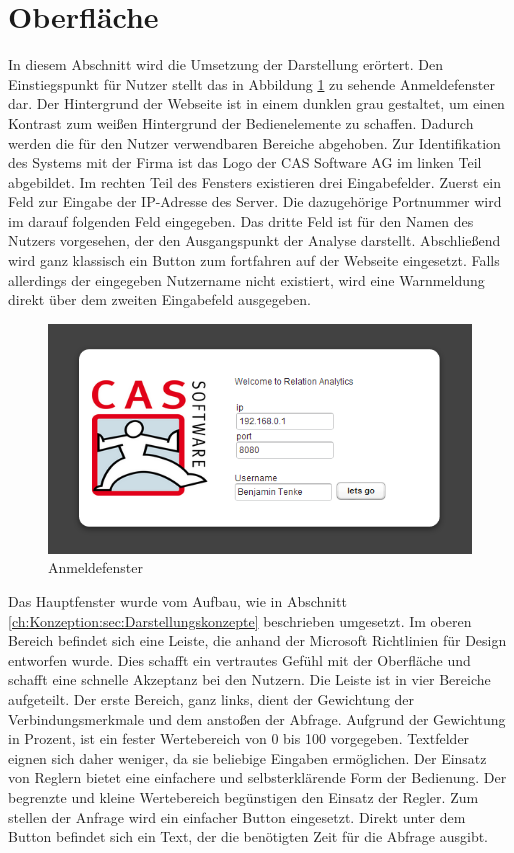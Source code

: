 \section{Oberfläche}

In diesem Abschnitt wird die Umsetzung der Darstellung erörtert. Den Einstiegspunkt für Nutzer stellt das in Abbildung \ref{ergebniss_oberflaeche_anmeld} zu sehende Anmeldefenster dar. Der Hintergrund der Webseite ist in einem dunklen grau gestaltet, um einen Kontrast zum weißen Hintergrund der Bedienelemente zu schaffen. Dadurch werden die für den Nutzer verwendbaren Bereiche abgehoben. Zur Identifikation des Systems mit der Firma ist das Logo der CAS Software AG im linken Teil abgebildet. Im rechten Teil des Fensters existieren drei Eingabefelder. Zuerst ein Feld zur Eingabe der IP-Adresse des Server. Die dazugehörige Portnummer wird im darauf folgenden Feld eingegeben. Das dritte Feld ist für den Namen des Nutzers vorgesehen, der den Ausgangspunkt der Analyse darstellt. Abschließend wird ganz klassisch ein Button zum fortfahren auf der Webseite eingesetzt. Falls allerdings der eingegeben Nutzername nicht existiert, wird eine Warnmeldung direkt über dem zweiten Eingabefeld ausgegeben. 

\begin{figure}[htbp]
\centering
\includegraphics[scale=2.0]{pics/login.png}
\caption{Anmeldefenster}
\label{ergebniss_oberflaeche_anmeld}
\end{figure}

Das Hauptfenster wurde vom Aufbau, wie in Abschnitt \ref{ch:Konzeption:sec:Darstellungskonzepte} beschrieben umgesetzt. Im oberen Bereich befindet sich eine Leiste, die anhand der Microsoft Richtlinien für Design entworfen wurde. Dies schafft ein vertrautes Gefühl mit der Oberfläche und schafft eine schnelle Akzeptanz bei den Nutzern. Die Leiste ist in vier Bereiche aufgeteilt. Der erste Bereich, ganz links, dient der Gewichtung der Verbindungsmerkmale und dem anstoßen der Abfrage. Aufgrund der Gewichtung in Prozent, ist ein fester Wertebereich von 0 bis 100 vorgegeben. Textfelder eignen sich daher weniger, da sie beliebige Eingaben ermöglichen. Der Einsatz von Reglern bietet eine einfachere und selbsterklärende Form der Bedienung. Der begrenzte und kleine Wertebereich begünstigen den Einsatz der Regler. Zum stellen der Anfrage wird ein einfacher Button eingesetzt. Direkt unter dem Button befindet sich ein Text, der die benötigten Zeit für die Abfrage ausgibt. 

